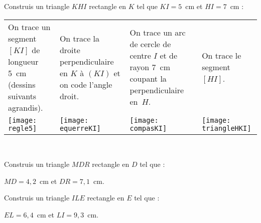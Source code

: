 \begin{methode*1}

\begin{exemple*1}
Construis un triangle $KHI$ rectangle en $K$ tel que $KI = 5$ cm et $HI = 7$ cm : \\[1em]
\begin{tabularx}{\textwidth}{X|X|X|X}
 On trace un segment $[KI]$ de longueur 5 cm (dessins suivants agrandis). & On trace la droite perpendiculaire en $K$ à $(KI)$ et on code l'angle droit. & On trace un arc de cercle de centre $I$ et de rayon 7 cm coupant la perpendiculaire en $H$. & On trace le segment $[HI]$.\\
 \texttt{[image: regle5]} & \texttt{[image: equerreKI]} & \texttt{[image: compasKI]} & \texttt{[image: triangleHKI]} \\ 
\end{tabularx} \\

\end{exemple*1}

\exercice 
Construis un triangle $MDR$ rectangle en $D$ tel que :

$MD = 4,2$ cm et $DR = 7,1$ cm. 
 
\exercice
Construis un triangle $ILE$ rectangle en $E$ tel que :

$EL = 6,4$ cm et $LI = 9,3$ cm.
 
\end{methode*1}


